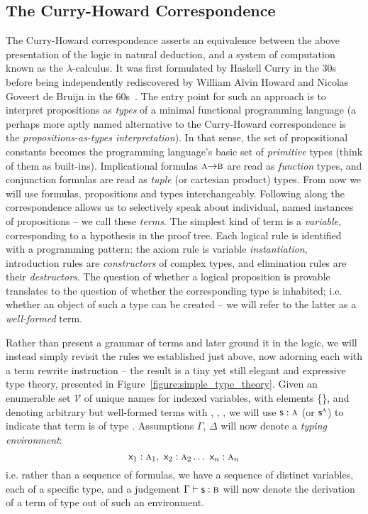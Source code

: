 \subsection{The Curry-Howard Correspondence}
The Curry-Howard correspondence asserts an equivalence between the above presentation of the logic in natural deduction, and a system of computation known as the $\lambda$-calculus.
It was first formulated by Haskell Curry in the 30s before being independently rediscovered by William Alvin Howard and Nicolas Goveert de Bruijn in the 60s~\cite{curry1934functionality,de1983automath,howard1980formulae}.
The entry point for such an approach is to interpret propositions as \textit{types} of a minimal functional programming language (a perhaps more aptly named alternative to the Curry-Howard correspondence is the \textit{propositions-as-types interpretation}).
In that sense, the set of propositional constants \propcon{} becomes the programming language's basic set of \textit{primitive} types (think of them as built-ins).
Implicational formulas $\prop A \ii \prop B$ are read as \textit{function} types, and conjunction formulas are read as \textit{tuple} (or cartesian product) types.
From now we will use formulas, propositions and types interchangeably.
Following along the correspondence allows us to selectively speak about individual, named instances of propositions -- we call these \textit{terms}.
The simplest kind of term is a \textit{variable}, corresponding to a hypothesis in the proof tree.
Each logical rule is identified with a programming pattern: the axiom rule is variable \textit{instantiation}, introduction rules are \textit{constructors} of complex types, and elimination rules are their \textit{destructors}.
The question of whether a logical proposition is provable translates to the question of whether the corresponding type is inhabited; i.e. whether an object of such a type can be created -- we will refer to the latter as a \textit{well-formed} term.

Rather than present a grammar of terms and later ground it in the logic, we will instead simply revisit the rules we established just above, now adorning each with a term rewrite instruction -- the result is a tiny yet still elegant and expressive type theory, presented in Figure~\ref{figure:simple_type_theory}.
Given an enumerable set $\mathcal{V}$ of unique names for indexed variables, with elements \{\}, and denoting arbitrary but well-formed terms with , , , we will use $\term{s}: \prop{A}$ (or $\term{s}^{\smallprop{A}}$) to indicate that term  is of type .
Assumptions $\Gamma$, $\Delta$ will now denote a \textit{typing environment}:
\[
\term x_1 : \prop  A_1 ,~ \term x_2 : \prop A_2 \dots ~ \term x_n : \prop A_n
\]
i.e. rather than a sequence of formulas, we have a sequence of distinct variables, each of a specific type, and a judgement $\Gamma \vdash \term{s} : \prop{B}$ will now denote the derivation of a term  of type  out of such an environment.

